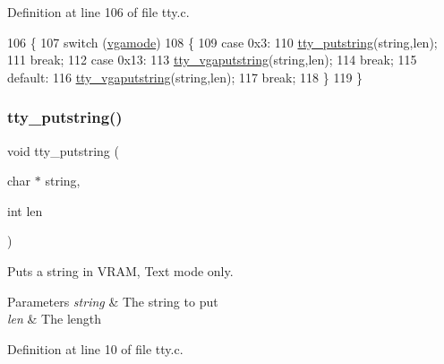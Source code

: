 Definition at line 106 of file tty.\+c.


\begin{DoxyCode}
106                                             \{
107     \textcolor{keywordflow}{switch} (\hyperlink{a00053_af93b0649fdd1bea5b6d29ed37205aa2c_af93b0649fdd1bea5b6d29ed37205aa2c}{vgamode})
108     \{
109     \textcolor{keywordflow}{case} 0x3:
110         \hyperlink{a00149_a5b5bf610a57f3c59b2851fa2652081ec_a5b5bf610a57f3c59b2851fa2652081ec}{tty\_putstring}(\textcolor{keywordtype}{string},len);
111         \textcolor{keywordflow}{break};
112     \textcolor{keywordflow}{case} 0x13:
113         \hyperlink{a00149_a05ca3f5e64f38fec173b635ca8465415_a05ca3f5e64f38fec173b635ca8465415}{tty\_vgaputstring}(\textcolor{keywordtype}{string},len);
114         \textcolor{keywordflow}{break};
115     \textcolor{keywordflow}{default}:
116         \hyperlink{a00149_a05ca3f5e64f38fec173b635ca8465415_a05ca3f5e64f38fec173b635ca8465415}{tty\_vgaputstring}(\textcolor{keywordtype}{string},len);
117         \textcolor{keywordflow}{break};
118     \}
119 \}
\end{DoxyCode}
\mbox{\label{a00149_a5b5bf610a57f3c59b2851fa2652081ec_a5b5bf610a57f3c59b2851fa2652081ec}} 
\subsubsection{\texorpdfstring{tty\+\_\+putstring()}{tty\_putstring()}}
{\footnotesize\ttfamily void tty\+\_\+putstring (\begin{DoxyParamCaption}\item[{char $\ast$}]{string,  }\item[{int}]{len }\end{DoxyParamCaption})}



Puts a string in V\+R\+AM, Text mode only. 


\begin{DoxyParams}{Parameters}
{\em string} & The string to put \\
\hline
{\em len} & The length \\
\hline
\end{DoxyParams}


Definition at line 10 of file tty.\+c.


